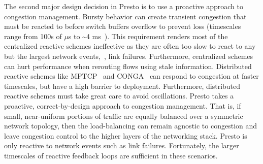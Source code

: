  The second major design decision in 
Presto is to use a proactive approach to congestion management. Bursty 
behavior can create transient congestion that must be reacted to 
before switch buffers overflow to prevent loss (timescales range from 100s of $\mu$s 
to \textasciitilde{}4 ms~\cite{planck}). This requirement renders most of the centralized reactive schemes ineffective
as they are often too slow to react to any but the largest network events,~\eg{}, link failures. 
Furthermore, centralized schemes can hurt performance when rerouting
flows using stale information.
Distributed reactive schemes like MPTCP~\cite{mptcp} and 
CONGA~\cite{conga} can respond to congestion at faster timescales, but have a high barrier to deployment.
Furthermore, distributed reactive schemes must take great care to avoid oscillations.
Presto takes a proactive, correct-by-design approach to congestion management. 
That is, if small, near-uniform portions of traffic are equally
balanced over a symmetric network topology, then the load-balancing can remain agnostic to congestion and
leave congestion control to the higher layers of the networking stack.
Presto is only reactive to network events such as link failures. Fortunately, 
the larger timescales of reactive feedback loops are sufficient in these scenarios. 

